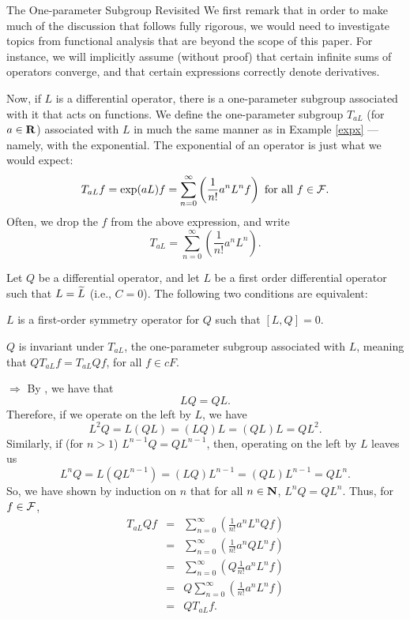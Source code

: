 \begin{section}{The One-parameter Subgroup Revisited}
We first remark that in order to make much of the discussion that follows fully rigorous, we would need to investigate topics from functional analysis that are beyond the scope of this paper.  For instance, we will implicitly assume (without proof) that certain infinite sums of operators converge, and that certain expressions correctly denote derivatives.

Now, if $L$ is a differential operator, there is a one-parameter subgroup associated with it that acts on functions.  We define the one-parameter subgroup $T_{aL}$ (for $a \in \mathbf{R}$) associated with $L$ in much the same manner as in Example \ref{expx} --- namely, with the exponential.  The exponential of an operator is just what we would expect:
\[
T_{aL} f = \exp(aL) f = \sum_{n=0}^\infty \left( \frac{1}{n!} a^n L^n f \right) \mbox{ for all }f \in \mathcal{F}.
\]
Often, we drop the $f$ from the above expression, and write
\[
T_{aL} = \sum_{n=0}^\infty \left( \frac{1}{n!} a^n L^n \right).
\]

\begin{theorem}
\label{symminvar}
Let $Q$ be a differential operator, and let $L$ be a first order differential operator such that $L = \widetilde{L}$ (i.e., $C = 0$).  The following two conditions are equivalent:

\noindent {}  $L$ is a first-order symmetry operator for $Q$ such that $[L,Q] = 0$.

\noindent {}  $Q$ is invariant under $T_{aL}$, the one-parameter subgroup associated with $L$, meaning that $Q T_{aL} f = T_{aL} Q f$, for all $f \in cF$.
\end{theorem}

\proof
\noindent {} $\Longrightarrow$   By , we have that
\[
LQ = QL.
\]
Therefore, if we operate on the left by $L$, we have
\[
L^2Q = L(QL) = (LQ)L = (QL)L = QL^2.
\]
Similarly, if (for $n > 1$) $L^{n-1}Q = QL^{n-1}$, then, operating on the left by $L$ leaves us
\[
L^nQ = L(QL^{n-1}) = (LQ)L^{n-1} = (QL)L^{n-1} = QL^n.
\]
So, we have shown by induction on $n$ that for all $n \in \mathbf{N}$, $L^nQ = QL^n$.  Thus, for $f \in \mathcal{F}$,
\begin{eqnarray}
\nonumber T_{aL}Qf & = & \sum_{n=0}^\infty \left( \frac{1}{n!} a^n L^n Q f \right) \\
\nonumber	  & = & \sum_{n=0}^\infty \left( \frac{1}{n!} a^n Q L^n f \right) \\
\nonumber	  & = & \sum_{n=0}^\infty \left( Q \frac{1}{n!} a^n L^n f \right) \\
\nonumber	  & = & Q \sum_{n=0}^\infty \left( \frac{1}{n!} a^n L^n f \right) \\
\label{commwithQ}
	  & = & Q T_{aL} f.
\end{eqnarray}


\end{section}
